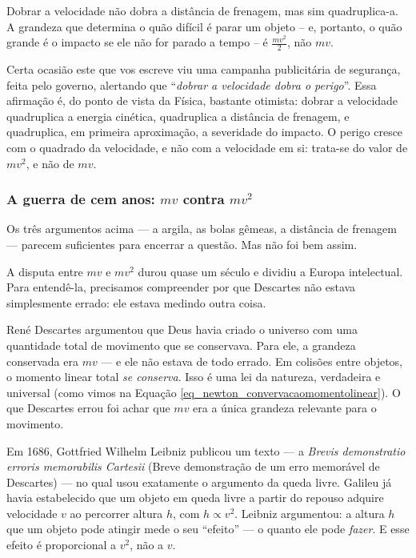 Dobrar a velocidade não dobra a distância de frenagem, mas sim quadruplica-a. A grandeza que determina o quão difícil é parar um objeto --
e, portanto, o quão grande é o impacto se ele não for parado a tempo -- é
$\frac{mv^2}{2}$, não $mv$.
 
Certa ocasião este que vos escreve viu uma campanha publicitária de segurança, feita pelo governo, alertando que ``\emph{dobrar a velocidade dobra o perigo}''. Essa afirmação é, do ponto de vista da Física, bastante otimista:
dobrar a velocidade quadruplica a energia cinética, quadruplica a distância de frenagem,
e quadruplica, em primeira aproximação, a severidade do impacto. O perigo cresce com o quadrado da velocidade, e não com a velocidade em si: trata-se do valor de $mv^2$, e não de $mv.$
 
\subsubsection*{A guerra de cem anos: $mv$ contra $mv^2$}
 
Os três argumentos acima — a argila, as bolas gêmeas, a distância de frenagem —
parecem suficientes para encerrar a questão. Mas não foi bem assim.
 
A disputa entre $mv$ e $mv^2$ durou quase um século e dividiu a Europa intelectual. Para entendê-la, precisamos compreender por que Descartes não
estava simplesmente errado: ele estava medindo outra coisa.
 
\medskip

René Descartes argumentou que Deus havia criado o universo com uma quantidade total
de movimento que se conservava. Para ele, a grandeza conservada era $mv$ — e ele não
estava de todo errado. Em colisões entre objetos, o momento linear total \textit{se
conserva}. Isso é uma lei da natureza, verdadeira e universal (como vimos na
Equação \ref{eq_newton_convervacaomomentolinear}). O que Descartes errou foi achar que $mv$ era a única grandeza relevante para o movimento.
 
\medskip

Em 1686, Gottfried Wilhelm Leibniz publicou um texto — a \textit{Brevis
demonstratio erroris memorabilis Cartesii} (Breve demonstração de um erro memorável
de Descartes) — no qual usou exatamente o argumento da queda livre. Galileu já havia
estabelecido que um objeto em queda livre a partir do repouso adquire velocidade $v$
ao percorrer altura $h$, com $h \propto v^2$. Leibniz argumentou: a altura $h$ que
um objeto pode atingir mede o seu ``efeito'' — o quanto ele pode \textit{fazer}.
E esse efeito é proporcional a $v^2$, não a $v$.
 
